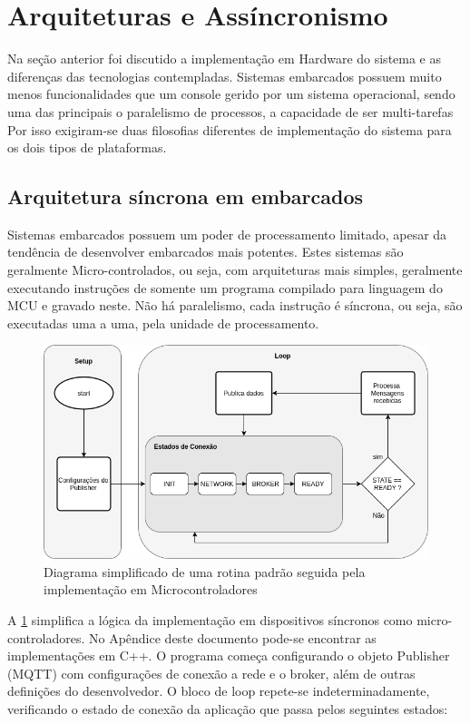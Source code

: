 \section{Arquiteturas e Assíncronismo}
\label{section:arquitetura}

Na seção anterior foi discutido a implementação em Hardware do sistema e as diferenças das tecnologias contempladas. Sistemas embarcados 
possuem muito menos funcionalidades que um console gerido por um sistema operacional, sendo uma das principais o paralelismo de processos, a capacidade de ser multi-tarefas Por isso exigiram-se duas filosofias diferentes de implementação do sistema para os dois tipos de plataformas.

\subsection{Arquitetura síncrona em embarcados}
\label{subsection:embarcados_sinc}

Sistemas embarcados possuem um poder de processamento limitado, apesar da tendência de desenvolver embarcados mais potentes. Estes sistemas são geralmente Micro-controlados, ou seja, com arquiteturas mais simples, geralmente executando instruções de somente um programa compilado para linguagem do MCU e gravado neste. Não há paralelismo, cada instrução é síncrona, ou seja, são executadas uma a uma, pela unidade de processamento.

\begin{figure}[h!]
\centering
\includegraphics[width=12cm]{./02_Capitulos/02_Cap3/figures/sinc_implementation}
\caption{Diagrama simplificado de uma rotina padrão seguida pela implementação em Microcontroladores}
\label{fig:sinc-implementation}
\end{figure}

A \ref{fig:sinc-implementation} simplifica a lógica da implementação em dispositivos síncronos como micro-controladores. No Apêndice deste documento pode-se encontrar as implementações em C++. O programa começa configurando o objeto Publisher (MQTT) com configurações de conexão a rede e o broker, além de outras definições do desenvolvedor. O bloco de loop repete-se indeterminadamente, verificando o estado de conexão da aplicação que passa pelos seguintes estados:

